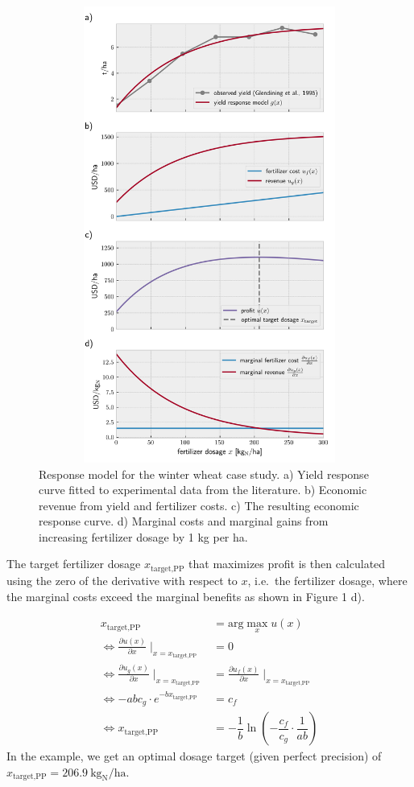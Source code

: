 \begin{figure}
\centering
\includegraphics[width=15cm,height=15cm,keepaspectratio]{imgs/synplot1.png}
\caption{Response model for the winter wheat case study. a) Yield response curve fitted to experimental data from the literature. b) Economic revenue from yield and fertilizer costs. c) The resulting economic response curve. d) Marginal costs and marginal gains from increasing fertilizer dosage by 1 kg per ha.}
\end{figure}

The target fertilizer dosage $x_\text{target,PP}$ that maximizes profit is then calculated using the zero of the derivative with respect to $x$, i.e.~the fertilizer dosage, where the marginal costs exceed the marginal benefits as shown in Figure 1 d).

\begin{align}
    x_\text{target,PP} &= \text{arg}\max_x u(x) \\
    \iff \frac{\partial u(x)}{\partial x} \mid_{x = x_\text{target,PP}} &= 0\\
    \iff \frac{\partial u_g(x)}{\partial x} \mid_{x = x_\text{target,PP}} &= \frac{\partial u_f(x)}{\partial x} \mid_{x = x_\text{target,PP}}\\
    \iff -abc_g \cdot e^{-bx_\text{target,PP}} &= c_f\\
    \iff x_\text{target,PP} &=  -\dfrac{1}{b} \ln\left(-\dfrac{c_f}{c_g}\cdot\dfrac{1}{ab}\right)
\end{align} In the example, we get an optimal dosage target (given perfect precision) of $x_\text{target,PP} = 206.9 \ \text{kg}_\text{N} / \text{ha}$.

